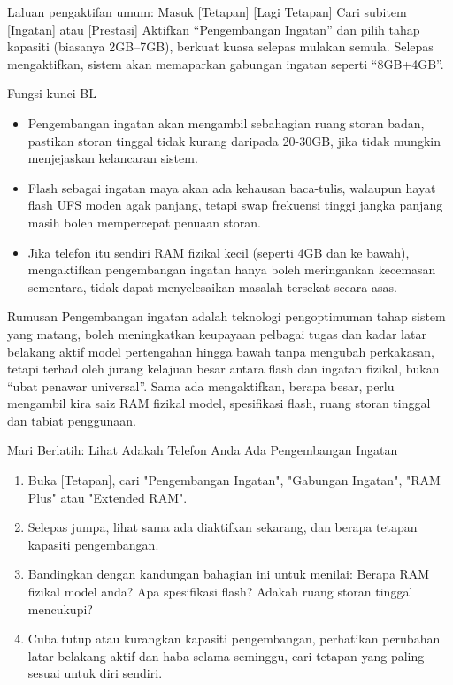 Laluan pengaktifan umum: Masuk [Tetapan] [Lagi Tetapan] Cari subitem [Ingatan] atau [Prestasi] Aktifkan “Pengembangan Ingatan” dan pilih tahap kapasiti (biasanya 2GB–7GB), berkuat kuasa selepas mulakan semula. Selepas mengaktifkan, sistem akan memaparkan gabungan ingatan seperti “8GB+4GB”.

\begin{tcbwarn}{Fungsi kunci BL}
\begin{itemize}
  \item Pengembangan ingatan akan mengambil sebahagian ruang storan badan, pastikan storan tinggal tidak kurang daripada 20-30GB, jika tidak mungkin menjejaskan kelancaran sistem.
  \item Flash sebagai ingatan maya akan ada kehausan baca-tulis, walaupun hayat flash UFS moden agak panjang, tetapi swap frekuensi tinggi jangka panjang masih boleh mempercepat penuaan storan.
  \item Jika telefon itu sendiri RAM fizikal kecil (seperti 4GB dan ke bawah), mengaktifkan pengembangan ingatan hanya boleh meringankan kecemasan sementara, tidak dapat menyelesaikan masalah tersekat secara asas.
\end{itemize}

\end{tcbwarn}

\begin{tcbinfo}{Rumusan}
Pengembangan ingatan adalah teknologi pengoptimuman tahap sistem yang matang, boleh meningkatkan keupayaan pelbagai tugas dan kadar latar belakang aktif model pertengahan hingga bawah tanpa mengubah perkakasan, tetapi terhad oleh jurang kelajuan besar antara flash dan ingatan fizikal, bukan “ubat penawar universal”. Sama ada mengaktifkan, berapa besar, perlu mengambil kira saiz RAM fizikal model, spesifikasi flash, ruang storan tinggal dan tabiat penggunaan.

\end{tcbinfo}

\begin{tcbpractice}{Mari Berlatih: Lihat Adakah Telefon Anda Ada Pengembangan Ingatan}
\begin{enumerate}
  \item Buka [Tetapan], cari "Pengembangan Ingatan", "Gabungan Ingatan", "RAM Plus" atau "Extended RAM".
  \item Selepas jumpa, lihat sama ada diaktifkan sekarang, dan berapa tetapan kapasiti pengembangan.
  \item Bandingkan dengan kandungan bahagian ini untuk menilai: Berapa RAM fizikal model anda? Apa spesifikasi flash? Adakah ruang storan tinggal mencukupi?
  \item Cuba tutup atau kurangkan kapasiti pengembangan, perhatikan perubahan latar belakang aktif dan haba selama seminggu, cari tetapan yang paling sesuai untuk diri sendiri.
\end{enumerate}

\end{tcbpractice}
